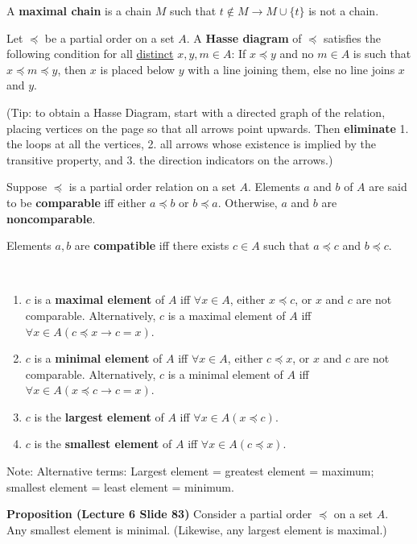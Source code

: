 \documentclass{article}
\begin{document}
\begin{description}
	\item[Maximal Chain (Tutorial 10 Q11)]A \textbf{maximal chain} is a chain $M$ such that $t\not\in M\to M\cup \{t\}$ is not a chain.
	\item[Hasse Diagram]Let $\preceq$ be a partial order on a set $A$. A \textbf{Hasse diagram} of $\preceq$ satisfies the following condition for all \underline{distinct} $x,y,m\in A$: If $x\preceq y$ and no $m \in A$ is such that $x\preceq m\preceq y$, then $x$ is placed below $y$ with a line joining them, else no line joins $x$ and $y$.
	\item \qquad (Tip: to obtain a Hasse Diagram, start with a directed graph of the relation, placing vertices on the page so that all arrows point upwards. Then \textbf{eliminate} 1. the loops at all the vertices, 2. all arrows whose existence is implied by the transitive property, and 3. the direction indicators on the arrows.)
	\item[Comparability]Suppose $\preceq$ is a partial order relation on a set $A$. Elements $a$ and $b$ of $A$ are said to be \textbf{comparable} iff either $a\preceq b$ or $b\preceq a$. Otherwise, $a$ and $b$ are \textbf{noncomparable}.
	\item[Compatible (Tutorial 5 Q7)]Elements $a, b$ are \textbf{compatible} iff there exists $c\in A$ such that $a\preceq c$ and $b \preceq c$. 
	\item[Maximal/Minimal/Largest/Smallest Element] \
	\begin{enumerate}
		\item $c$ is a \textbf{maximal element} of $A$ iff $\forall x\in A$, either $x\preceq c$, or $x$ and $c$ are not comparable. Alternatively, $c$ is a maximal element of $A$ iff $\forall x\in A(c\preceq x\to c=x)$.
		\item $c$ is a \textbf{minimal element} of $A$ iff $\forall x\in A$, either $c\preceq x$, or $x$ and $c$ are not comparable. Alternatively, $c$ is a minimal element of $A$ iff $\forall x\in A(x\preceq c\to c=x)$.
		\item $c$ is the \textbf{largest element} of $A$ iff $\forall x\in A(x\preceq c)$.
		\item $c$ is the \textbf{smallest element} of $A$ iff $\forall x\in A(c\preceq x)$.
	\end{enumerate}
	\item \qquad Note: Alternative terms: Largest element = greatest element = maximum; smallest element = least element = minimum.
	\item \qquad \textbf{Proposition (Lecture 6 Slide 83)} Consider a partial order $\preceq$ on a set $A$. Any smallest element is minimal. (Likewise, any largest element is maximal.)

\end{description}
\end{document}
